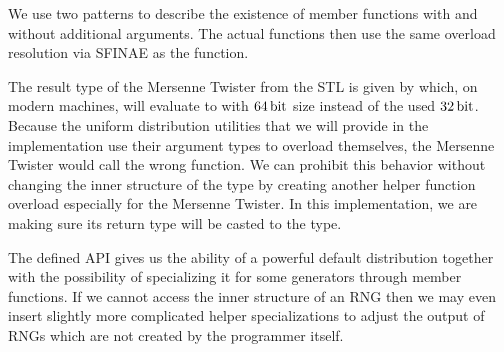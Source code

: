 \documentclass{stdlocal}
\begin{document}
    We use two  patterns to describe the existence of  member functions with and without additional arguments.
    The actual  functions then use the same overload resolution via SFINAE as the  function.

    The result type of the Mersenne Twister  from the STL is given by  which, on modern machines, will evaluate to  with $64\, \mathrm{bit}$ size instead of the used $32\, \mathrm{bit}$.
    Because the uniform distribution utilities that we will provide in the implementation use their argument types to overload themselves, the Mersenne Twister would call the wrong function.
    We can prohibit this behavior without changing the inner structure of the  type by creating another helper function overload especially for the Mersenne Twister.
    In this implementation, we are making sure its return type will be casted to the  type.

    The defined API gives us the ability of a powerful default distribution together with the possibility of specializing it for some generators through member functions.
    If we cannot access the inner structure of an RNG then we may even insert slightly more complicated helper specializations to adjust the output of RNGs which are not created by the programmer itself.


\end{document}
